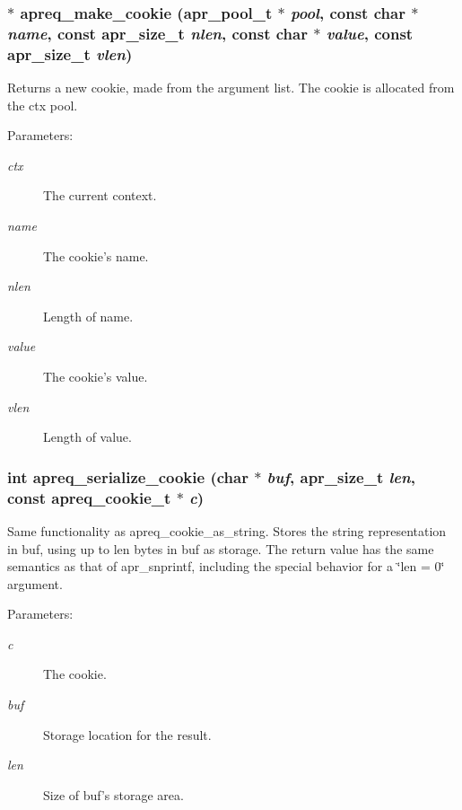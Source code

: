 \subsubsection{$\ast$ apreq\_\-make\_\-cookie ({\bf apr\_\-pool\_\-t} $\ast$ {\em pool}, const char $\ast$ {\em name}, const {\bf apr\_\-size\_\-t} {\em nlen}, const char $\ast$ {\em value}, const {\bf apr\_\-size\_\-t} {\em vlen})}\label{group__cookies_a5}


Returns a new cookie, made from the argument list. The cookie is allocated from the ctx pool.

\begin{Desc}
\item[Parameters:]
\begin{description}
\item[{\em ctx}]The current context. \item[{\em name}]The cookie's name. \item[{\em nlen}]Length of name. \item[{\em value}]The cookie's value. \item[{\em vlen}]Length of value. \end{description}
\end{Desc}
\subsubsection{\setlength{\rightskip}{0pt plus 5cm}int apreq\_\-serialize\_\-cookie (char $\ast$ {\em buf}, {\bf apr\_\-size\_\-t} {\em len}, const {\bf apreq\_\-cookie\_\-t} $\ast$ {\em c})}\label{group__cookies_a8}


Same functionality as apreq\_\-cookie\_\-as\_\-string. Stores the string representation in buf, using up to len bytes in buf as storage. The return value has the same semantics as that of apr\_\-snprintf, including the special behavior for a \char`\"{}len = 0\char`\"{} argument.

\begin{Desc}
\item[Parameters:]
\begin{description}
\item[{\em c}]The cookie. \item[{\em buf}]Storage location for the result. \item[{\em len}]Size of buf's storage area. \end{description}
\end{Desc}
